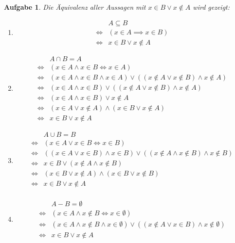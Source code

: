 \documentclass[a4paper,11pt,parskip=half,fleqn]{scrartcl}
\theoremstyle{note}
\newtheorem{aufgabe}{Aufgabe}
\begin{document}
\begin{aufgabe}
  Die Äquivalenz aller Aussagen mit $x\in B\lor x\not\in A$ wird gezeigt:
  \begin{enumerate}
    \item
      \begin{align*}
	&A\subseteq B \\
	\iff& (x\in A\implies x\in B) \\
	\iff& x\in B\lor x\not\in A
      \end{align*}
    \item
      \begin{align*}
	&A\cap B=A \\
	\iff& (x\in A\land x\in B\iff x\in A) \\
	\iff& (x\in A\land x\in B\land x\in A)\lor ((x\not\in A\lor x\not\in B)\land x\not\in A) \\
	\iff& (x\in A\land x\in B)\lor ((x\not\in A\lor x\not\in B)\land x\not\in A) \\
	\iff& (x\in A\land x\in B)\lor x\not\in A \\
	\iff& (x\in A\lor x\not\in A)\land (x\in B\lor x\not\in A) \\
	\iff& x\in B\lor x\not\in A
      \end{align*}
    \item
      \begin{align*}
	&A\cup B=B \\
	\iff& (x\in A\lor x\in B\iff x\in B) \\
	\iff& ((x\in A\lor x\in B)\land x\in B)\lor ((x\not\in A\land x\not\in B)\land x\not\in B) \\
	\iff& x\in B\lor (x\not\in A\land x\not\in B) \\
	\iff& (x\in B\lor x\not\in A)\land (x\in B\lor x\not\in B) \\
	\iff& x\in B\lor x\not\in A \\
      \end{align*}
    \item
      \begin{align*}
	&A-B=\emptyset \\
	\iff& (x\in A\land x\not\in B\iff x\in\emptyset) \\
	\iff& (x\in A\land x\not\in B\land x\in\emptyset)\lor ((x\not\in A\lor x\in B)\land x\not\in\emptyset) \\
	\iff& x\in B\lor x\not\in A
      \end{align*}
  \end{enumerate}
\end{aufgabe}
\end{document}
